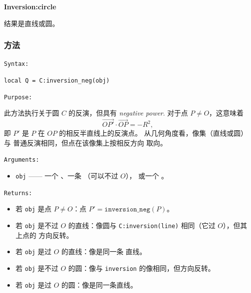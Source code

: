 \textbf{Inversion:circle}
 \label{par:inversion_circle}

结果是直线或圆。

\begin{tkzexample}[latex=.5\textwidth]
\begin{center}
\end{center}
\end{tkzexample}

\subsubsection{方法 }
\label{ssub:inversion_neg}


\texttt{Syntax: }

\verb|local Q = C:inversion_neg(obj)|

\texttt{Purpose: }

此方法执行关于圆 \(C\) 的反演，但具有
\emph{negative power}.
对于点 \(P \neq O\)，这意味着
\[
\overrightarrow{OP'} \cdot \overrightarrow{OP} = -R^2,
\]
即 \(P'\) 是 \(P\) 在 \(OP\) 的相反半直线上的反演点。
从几何角度看，像集（直线或圆）与
普通反演相同，但点在该像集上按相反方向
取向。

\texttt{Arguments: }
\begin{itemize}
  \item \verb|obj| —— 一个 、一条 （可以不过 \(O\)），
 或一个 。
\end{itemize}

\texttt{Returns: }
\begin{itemize}
  \item 若 \verb|obj| 是点 \(P\neq O\)：点 \(P'=\texttt{inversion\_neg}(P)\)。
  \item 若 \verb|obj| 是不过 \(O\) 的直线：像圆与
  \verb|C:inversion(line)| 相同（它过 \(O\)），但其上点的
  方向反转。
  \item 若 \verb|obj| 是过 \(O\) 的直线：像是同一条
  直线。
  \item 若 \verb|obj| 是不过 \(O\) 的圆：像与
  \verb|inversion| 的像相同，但方向反转。
  \item 若 \verb|obj| 是过 \(O\) 的圆：像是同一条直线。
\end{itemize}

